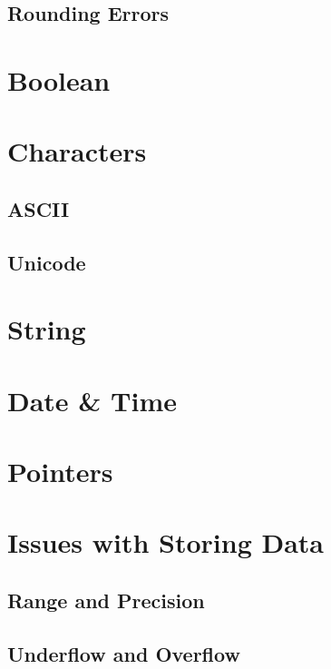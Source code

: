 		\subsection{Rounding Errors}
	\section{Boolean}
	
	\section{Characters}
		\subsection{ASCII}
		
		\subsection{Unicode}
		
	\section{String}
	
	\section{Date \& Time}
	
	\section{Pointers}
	
	\section{Issues with Storing Data}
		
		\subsection{Range and Precision}
			
		\subsection{Underflow and Overflow}